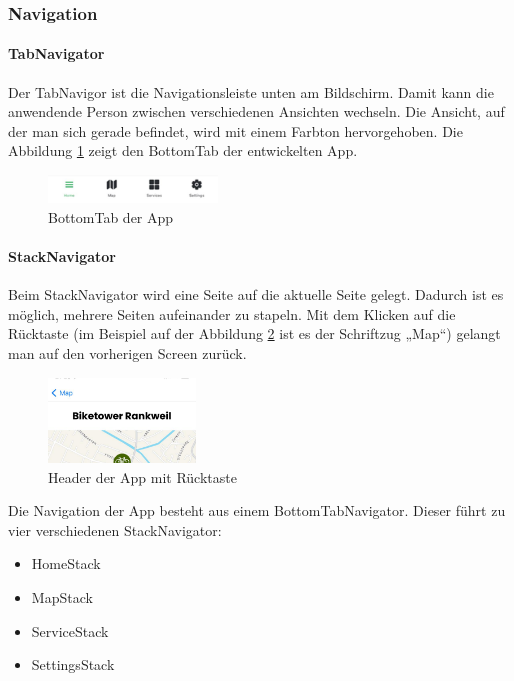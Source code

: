 \subsubsection{Navigation}
\paragraph{TabNavigator} Der TabNavigor ist die Navigationsleiste unten am Bildschirm. Damit kann die anwendende Person zwischen verschiedenen Ansichten wechseln. Die Ansicht, auf der man sich gerade befindet, wird mit einem Farbton hervorgehoben. Die Abbildung \ref{fig:bottomtab} zeigt den BottomTab der entwickelten App. 

\begin{figure}[H]
    \centering
    \includegraphics[width=0.4\textwidth]{images/tab.png}
    \caption{BottomTab der App}
    \label{fig:bottomtab}
\end{figure}

\paragraph{StackNavigator}Beim StackNavigator wird eine Seite auf die aktuelle Seite gelegt. Dadurch ist es möglich, mehrere Seiten aufeinander zu stapeln. Mit dem Klicken auf die Rücktaste (im Beispiel auf der Abbildung \ref{fig:appheader} ist es der Schriftzug „Map“) gelangt man auf den vorherigen Screen zurück. 

\begin{figure}[H]
    \centering
    \includegraphics[width=0.35\textwidth]{images/appheader.png}
    \caption{Header der App mit Rücktaste}
    \label{fig:appheader}
\end{figure}


Die Navigation der App besteht aus einem BottomTabNavigator. Dieser führt zu vier verschiedenen StackNavigator:

\begin{itemize}
    \item HomeStack
    \item MapStack
    \item ServiceStack
    \item SettingsStack
\end{itemize}

